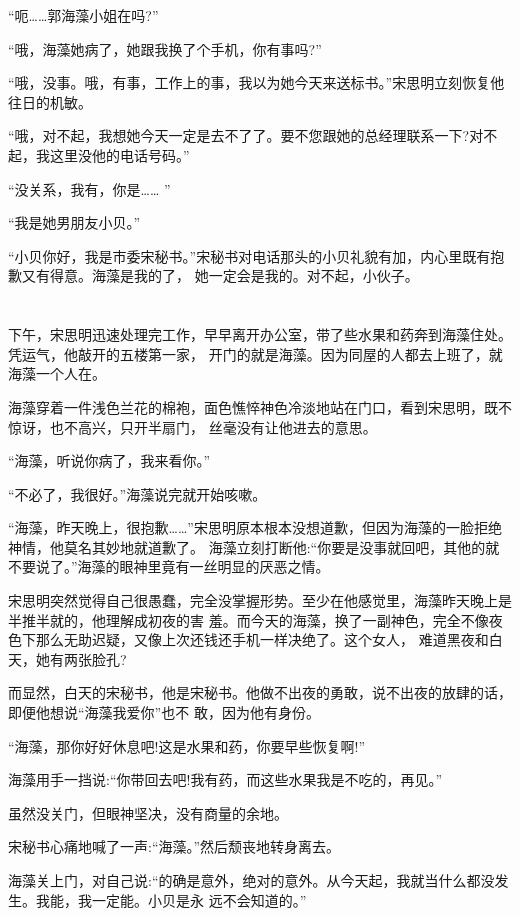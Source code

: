 \documentclass[11pt,a4paper,onecolumn]{article}
\begin{document}
``呃……郭海藻小姐在吗?''

``哦，海藻她病了，她跟我换了个手机，你有事吗?''

``哦，没事。哦，有事，工作上的事，我以为她今天来送标书。''宋思明立刻恢复他往日的机敏。

``哦，对不起，我想她今天一定是去不了了。要不您跟她的总经理联系一下?对不起，我这里没他的电话号码。''

``没关系，我有，你是…… ''

``我是她男朋友小贝。''

``小贝你好，我是市委宋秘书。''宋秘书对电话那头的小贝礼貌有加，内心里既有抱歉又有得意。海藻是我的了，
她一定会是我的。对不起，小伙子。

\section[\thesection]{}

下午，宋思明迅速处理完工作，早早离开办公室，带了些水果和药奔到海藻住处。凭运气，他敲开的五楼第一家，
开门的就是海藻。因为同屋的人都去上班了，就海藻一个人在。

海藻穿着一件浅色兰花的棉袍，面色憔悴神色冷淡地站在门口，看到宋思明，既不惊讶，也不高兴，只开半扇门，
丝毫没有让他进去的意思。

``海藻，听说你病了，我来看你。''

``不必了，我很好。''海藻说完就开始咳嗽。

``海藻，昨天晚上，很抱歉……''宋思明原本根本没想道歉，但因为海藻的一脸拒绝神情，他莫名其妙地就道歉了。
海藻立刻打断他:``你要是没事就回吧，其他的就不要说了。''海藻的眼神里竟有一丝明显的厌恶之情。

宋思明突然觉得自己很愚蠢，完全没掌握形势。至少在他感觉里，海藻昨天晚上是半推半就的，他理解成初夜的害
羞。而今天的海藻，换了一副神色，完全不像夜色下那么无助迟疑，又像上次还钱还手机一样决绝了。这个女人，
难道黑夜和白天，她有两张脸孔?

而显然，白天的宋秘书，他是宋秘书。他做不出夜的勇敢，说不出夜的放肆的话，即便他想说``海藻我爱你''也不
敢，因为他有身份。

``海藻，那你好好休息吧!这是水果和药，你要早些恢复啊!''

海藻用手一挡说:``你带回去吧!我有药，而这些水果我是不吃的，再见。''

虽然没关门，但眼神坚决，没有商量的余地。

宋秘书心痛地喊了一声:``海藻。''然后颓丧地转身离去。

海藻关上门，对自己说:``的确是意外，绝对的意外。从今天起，我就当什么都没发生。我能，我一定能。小贝是永
远不会知道的。''
\end{document}
